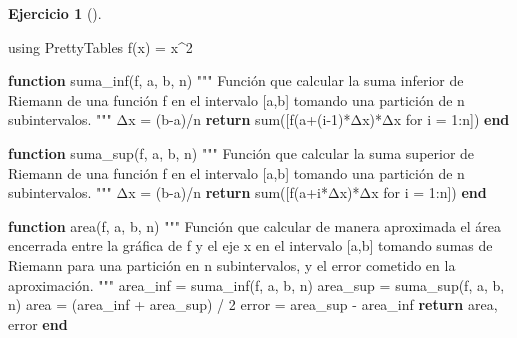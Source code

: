 \documentclass[
  a4paper,
]{scrreport}
\newenvironment{Shaded}{\begin{snugshade}}{\end{snugshade}}
\newcommand{\BuiltInTok}[1]{\textcolor[rgb]{0.00,0.23,0.31}{#1}}
\newcommand{\ControlFlowTok}[1]{\textcolor[rgb]{0.00,0.23,0.31}{\textbf{#1}}}
\newcommand{\FloatTok}[1]{\textcolor[rgb]{0.68,0.00,0.00}{#1}}
\newcommand{\FunctionTok}[1]{\textcolor[rgb]{0.28,0.35,0.67}{#1}}
\newcommand{\ImportTok}[1]{\textcolor[rgb]{0.00,0.46,0.62}{#1}}
\newcommand{\KeywordTok}[1]{\textcolor[rgb]{0.00,0.23,0.31}{\textbf{#1}}}
\newcommand{\NormalTok}[1]{\textcolor[rgb]{0.00,0.23,0.31}{#1}}
\newcommand{\OperatorTok}[1]{\textcolor[rgb]{0.37,0.37,0.37}{#1}}
\newcommand{\StringTok}[1]{\textcolor[rgb]{0.13,0.47,0.30}{#1}}
\theoremstyle{definition}
\newtheorem{exercise}{Ejercicio}[chapter]
\theoremstyle{remark}
\begin{document}
\begin{exercise}[]
\begin{enumerate}
  \begin{tcolorbox}[enhanced jigsaw, bottomtitle=1mm, rightrule=.15mm, left=2mm, colback=white, title=\textcolor{quarto-callout-tip-color}{\faLightbulb}\hspace{0.5em}{Solución}, bottomrule=.15mm, colframe=quarto-callout-tip-color-frame, toprule=.15mm, leftrule=.75mm, opacityback=0, coltitle=black, breakable, colbacktitle=quarto-callout-tip-color!10!white, arc=.35mm, toptitle=1mm, titlerule=0mm, opacitybacktitle=0.6]

\begin{Shaded}
\begin{Highlighting}[]
\ImportTok{using} \BuiltInTok{PrettyTables}
\FunctionTok{f}\NormalTok{(x) }\OperatorTok{=}\NormalTok{ x}\OperatorTok{\^{}}\FloatTok{2}

\KeywordTok{function} \FunctionTok{suma\_inf}\NormalTok{(f, a, b, n)}
    \StringTok{"""}
\StringTok{    Función que calcular la suma inferior de Riemann de una función f en el intervalo [a,b] tomando una partición de n subintervalos.}
\StringTok{    """}
\NormalTok{    Δx }\OperatorTok{=}\NormalTok{ (b}\OperatorTok{{-}}\NormalTok{a)}\OperatorTok{/}\NormalTok{n}
    \ControlFlowTok{return} \FunctionTok{sum}\NormalTok{([}\FunctionTok{f}\NormalTok{(}\FunctionTok{a+}\NormalTok{(i}\OperatorTok{{-}}\FloatTok{1}\NormalTok{)}\OperatorTok{*}\NormalTok{Δx)}\OperatorTok{*}\NormalTok{Δx for i }\OperatorTok{=} \FloatTok{1}\OperatorTok{:}\NormalTok{n])}
\KeywordTok{end}

\KeywordTok{function} \FunctionTok{suma\_sup}\NormalTok{(f, a, b, n)}
    \StringTok{"""}
\StringTok{    Función que calcular la suma superior de Riemann de una función f en el intervalo [a,b] tomando una partición de n subintervalos.}
\StringTok{    """}
\NormalTok{    Δx }\OperatorTok{=}\NormalTok{ (b}\OperatorTok{{-}}\NormalTok{a)}\OperatorTok{/}\NormalTok{n}
    \ControlFlowTok{return} \FunctionTok{sum}\NormalTok{([}\FunctionTok{f}\NormalTok{(a}\OperatorTok{+}\NormalTok{i}\OperatorTok{*}\NormalTok{Δx)}\OperatorTok{*}\NormalTok{Δx for i }\OperatorTok{=} \FloatTok{1}\OperatorTok{:}\NormalTok{n])}
\KeywordTok{end}

\KeywordTok{function} \FunctionTok{area}\NormalTok{(f, a, b, n)}
    \StringTok{"""}
\StringTok{    Función que calcular de manera aproximada el área encerrada entre la gráfica de f y el eje x en el intervalo [a,b] tomando sumas de Riemann para una partición en n subintervalos, y el error cometido en la aproximación.}
\StringTok{    """}
\NormalTok{    area\_inf }\OperatorTok{=} \FunctionTok{suma\_inf}\NormalTok{(f, a, b, n)}
\NormalTok{    area\_sup }\OperatorTok{=} \FunctionTok{suma\_sup}\NormalTok{(f, a, b, n)}
\NormalTok{    area }\OperatorTok{=}\NormalTok{ (area\_inf }\OperatorTok{+}\NormalTok{ area\_sup) }\OperatorTok{/} \FloatTok{2}
\NormalTok{    error }\OperatorTok{=}\NormalTok{ area\_sup }\OperatorTok{{-}}\NormalTok{ area\_inf}
    \ControlFlowTok{return}\NormalTok{ area, error}
\KeywordTok{end}


\end{Highlighting}
\end{Shaded}
\end{tcolorbox}
\end{enumerate}
\end{exercise}
\end{document}

